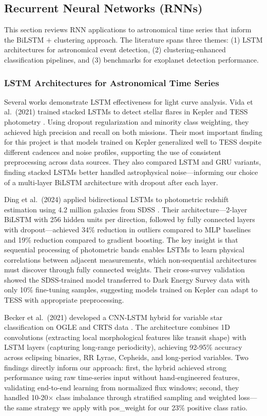 \subsection{Recurrent Neural Networks (RNNs)}

This section reviews RNN applications to astronomical time series that inform the BiLSTM + clustering approach. The literature spans three themes: (1) LSTM architectures for astronomical event detection, (2) clustering-enhanced classification pipelines, and (3) benchmarks for exoplanet detection performance.

\subsubsection{LSTM Architectures for Astronomical Time Series}

Several works demonstrate LSTM effectiveness for light curve analysis. Vida et al.\ (2021) trained stacked LSTMs to detect stellar flares in Kepler and TESS photometry \cite{Vida2021findingflaresrecurrent}. Using dropout regularization and minority class weighting, they achieved high precision and recall on both missions. Their most important finding for this project is that models trained on Kepler generalized well to TESS despite different cadences and noise profiles, supporting the use of consistent preprocessing across data sources. They also compared LSTM and GRU variants, finding stacked LSTMs better handled astrophysical noise---informing our choice of a multi-layer BiLSTM architecture with dropout after each layer.

Ding et al.\ (2024) applied bidirectional LSTMs to photometric redshift estimation using 4.2 million galaxies from SDSS \cite{Ding2024photometric}. Their architecture---2-layer BiLSTM with 256 hidden units per direction, followed by fully connected layers with dropout---achieved 34\% reduction in outliers compared to MLP baselines and 19\% reduction compared to gradient boosting. The key insight is that sequential processing of photometric bands enables LSTMs to learn physical correlations between adjacent measurements, which non-sequential architectures must discover through fully connected weights. Their cross-survey validation showed the SDSS-trained model transferred to Dark Energy Survey data with only 10\% fine-tuning samples, suggesting models trained on Kepler can adapt to TESS with appropriate preprocessing.

Becker et al.\ (2021) developed a CNN-LSTM hybrid for variable star classification on OGLE and CRTS data \cite{Becker2021variablestars}. The architecture combines 1D convolutions (extracting local morphological features like transit shape) with LSTM layers (capturing long-range periodicity), achieving 92-95\% accuracy across eclipsing binaries, RR Lyrae, Cepheids, and long-period variables. Two findings directly inform our approach: first, the hybrid achieved strong performance using raw time-series input without hand-engineered features, validating end-to-end learning from normalized flux windows; second, they handled 10-20$\times$ class imbalance through stratified sampling and weighted loss---the same strategy we apply with pos\_weight for our 23\% positive class ratio.

